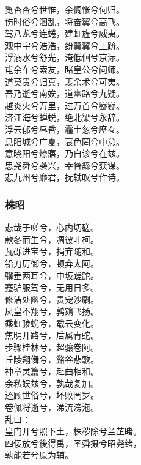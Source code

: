 \documentclass[]{article}
\begin{document}
览杳杳兮世惟，余惆怅兮何归。\\
伤时俗兮溷乱，将奋翼兮高飞。\\
驾八龙兮连蜷，建虹旌兮威夷。\\
观中宇兮浩浩，纷翼翼兮上跻。\\
浮溺水兮舒光，淹低佪兮京沶。\\
屯余车兮索友，睹皇公兮问师。\\
道莫贵兮归真，羡余术兮可夷。\\
吾乃逝兮南娭，道幽路兮九疑。\\
越炎火兮万里，过万首兮嶷嶷。\\
济江海兮蝉蜕，绝北梁兮永辞。\\
浮云郁兮昼昏，霾土忽兮塺々。\\
息阳城兮广夏，衰色罔兮中怠。\\
意晓阳兮燎寤，乃自诊兮在兹。\\
思尧舜兮袭兴，幸咎繇兮获谋。\\
悲九州兮靡君，抚轼叹兮作诗。

\hypertarget{header-n3073}{%
\subsubsection{株昭}\label{header-n3073}}

悲哉于嗟兮，心内切磋。\\
款冬而生兮，凋彼叶柯。\\
瓦砾进宝兮，捐弃随和。\\
铅刀厉御兮，顿弃太阿。\\
骥垂两耳兮，中坂蹉跎。\\
蹇驴服驾兮，无用日多。\\
修洁处幽兮，贵宠沙劘。\\
凤皇不翔兮，鹑鴳飞扬。\\
乘虹骖蜺兮，载云变化。\\
焦明开路兮，后属青蛇。\\
步骤桂林兮，超骧卷阿。\\
丘陵翔儛兮，谿谷悲歌。\\
神章灵篇兮，赴曲相和。\\
余私娱兹兮，孰哉复加。\\
还顾世俗兮，坏败罔罗。\\
卷佩将逝兮，涕流滂沲。\\
乱曰：\\
皇门开兮照下土，株秽除兮兰芷睹。\\
四佞放兮後得禹，圣舜摄兮昭尧绪，\\
孰能若兮原为辅。
\end{document}
